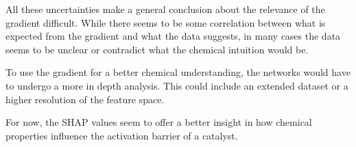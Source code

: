 All these uncertainties make a general conclusion about the relevance of the gradient difficult.
While there seems to be some correlation between what is expected from the gradient and what 
the data suggests, in many cases the data seems to be unclear or contradict what the chemical intuition would be.

To use the gradient for a better chemical understanding, the networks would have to undergo a more in depth analysis.
This could include an extended dataset or a higher resolution of the feature space.

For now, the SHAP values seem to offer a better insight in how chemical properties influence the activation barrier of a catalyst.